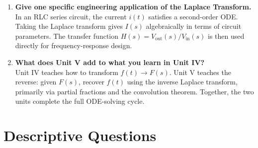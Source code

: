 \documentclass[12pt,a4paper]{article}
\begin{document}
\begin{enumerate}[label=\textbf{Q\arabic*.}, leftmargin=*, itemsep=6pt]
  \item \textbf{Give one specific engineering application of the Laplace
        Transform.} \\
        In an RLC series circuit, the current $i(t)$ satisfies a second-order
        ODE.  Taking the Laplace transform gives $I(s)$ algebraically in
        terms of circuit parameters.  The transfer function
        $H(s) = V_{\text{out}}(s)/V_{\text{in}}(s)$ is then used directly
        for frequency-response design.

  \item \textbf{What does Unit V add to what you learn in Unit IV?} \\
        Unit IV teaches how to transform $f(t) \to F(s)$.  Unit V teaches the
        reverse: given $F(s)$, recover $f(t)$ using the inverse Laplace
        transform, primarily via partial fractions and the convolution
        theorem.  Together, the two units complete the full ODE-solving cycle.

\end{enumerate}

\section{Descriptive Questions}
\end{document}
